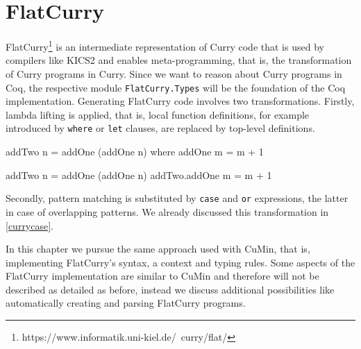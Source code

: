 \documentclass[paper = a4, fleqn, abstract=on, twoside]{scrreprt}
\begin{document}
\chapter{FlatCurry}
\label{flatcurry}
FlatCurry\footnote{https://www.informatik.uni-kiel.de/~curry/flat/} is an intermediate representation of Curry code that is used by compilers like KICS2 and enables meta-programming, that is, the transformation of Curry programs in Curry. Since we want to reason about Curry programs in Coq, the respective module \texttt{FlatCurry.Types} will be the foundation of the Coq implementation. Generating FlatCurry code involves two transformations. Firstly, lambda lifting is applied, that is, local function definitions, for example introduced by \texttt{where} or \texttt{let} clauses, are replaced by top-level definitions.
\begin{flushleft}
\begin{minipage}{.3\linewidth}
\begin{haskellcode}
addTwo n = addOne (addOne n)
  where addOne m = m + 1
\end{haskellcode}
\end{minipage}
\hfill
\vrule
\hspace{.5em}
\begin{minipage}{.6\linewidth}
\begin{haskellcode}
addTwo n = addOne (addOne n)
addTwo.addOne m = m + 1
\end{haskellcode}
\end{minipage}
\end{flushleft}
Secondly, pattern matching is substituted by \texttt{case} and \texttt{or} expressions, the latter in case of overlapping patterns. We already discussed this transformation in \autoref{currycase}.\\
\par \noindent
In this chapter we pursue the same approach used with CuMin, that is, implementing FlatCurry's syntax, a context and typing rules. Some aspects of the FlatCurry implementation are similar to CuMin and therefore will not be described as detailed as before, instead we discuss additional possibilities like automatically creating and parsing FlatCurry programs.
\end{document}
